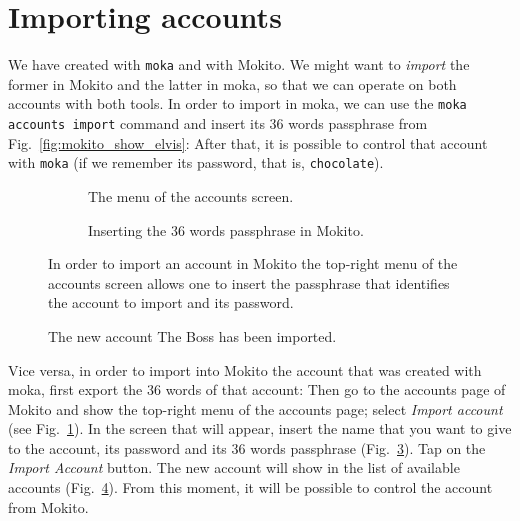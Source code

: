 \section{Importing accounts}\label{sec:importing_accounts}

We have created \texttt{\accountOneShort{}} with \texttt{moka} and
\texttt{\accountMokitoShort{}} with Mokito. We might want to \emph{import} the former in Mokito
and the latter in moka, so that we can operate on both accounts with both tools. In order to import
\texttt{\accountMokitoShort{}} in moka, we can use the \texttt{moka accounts import} command
and insert its 36 words passphrase from Fig.~\ref{fig:mokito_show_elvis}:
%
%
After that, it is possible to control that account with \texttt{moka} (if we remember
its password, that is, \texttt{chocolate}).
%
\begin{figure}[t]
\centering
\begin{subfigure}{.5\textwidth}
  \centering
  \caption{The menu of the accounts screen.}
  \label{fig:mokito_accounts_menu}
\end{subfigure}%
\begin{subfigure}{.5\textwidth}
  \centering
  \caption{Inserting the 36 words passphrase in Mokito.}
  \label{fig:mokito_insert_passphrase}
\end{subfigure}
\caption{In order to import an account in Mokito the top-right menu of the accounts screen allows one to insert the passphrase that identifies the account to import and its password.}
\end{figure}
%
\begin{figure}[t]
  \begin{center}
  \end{center}
  \caption{The new account The Boss has been imported.}
  \label{fig:mokito_added_the_boss}
\end{figure}

Vice versa, in order to import into Mokito the account that was created with moka,
first export the 36 words of that account:
%
%
Then go to the accounts page of Mokito and show the
top-right menu of the accounts page; select \emph{Import account}
(see Fig.~\ref{fig:mokito_accounts_menu}).
In the screen that will appear, insert the name that you want to give to the account,
its password and its 36 words passphrase
(Fig.~\ref{fig:mokito_insert_passphrase}).
Tap on the \emph{Import Account} button.
The new account will show in the list of
available accounts (Fig.~\ref{fig:mokito_added_the_boss}). From this moment,
it will be possible to control the account from Mokito.

